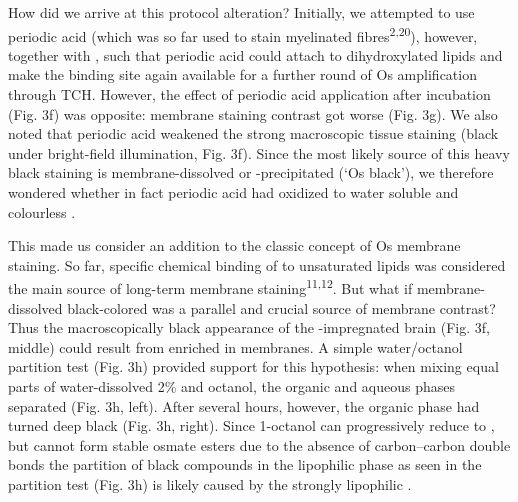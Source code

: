\documentclass{article}
\begin{document}
\noindent How did we arrive at this protocol alteration? Initially, we attempted to use periodic acid (which was so far used to stain myelinated fibres\textsuperscript{2,20}), however, together with , such that periodic acid could attach to dihydroxylated lipids and make the binding site again available for a further round of Os amplification through TCH. However, the effect of periodic acid application after  incubation (Fig. 3f) was opposite: membrane staining contrast got worse (Fig. 3g). We also noted that periodic acid weakened the strong macroscopic tissue staining (black under bright-field illumination, Fig. 3f). Since the most likely source of this heavy black staining is membrane-dissolved or -precipitated  (`Os black'), we therefore wondered whether in fact periodic acid had oxidized  to water soluble and colourless .

This made us consider an addition to the classic concept of Os membrane staining. So far, specific chemical binding of  to unsaturated lipids was considered the main source of long-term membrane staining\textsuperscript{11,12}. But what if membrane-dissolved black-colored  was a parallel and crucial source of membrane contrast? Thus the macroscopically black appearance of the -impregnated brain (Fig. 3f, middle) could result from  enriched in membranes. A simple water/octanol partition test (Fig. 3h) provided support for this hypothesis: when mixing equal parts of water-dissolved 2\%  and octanol, the organic and aqueous phases separated (Fig. 3h, left). After several hours, however, the organic phase had turned deep black (Fig. 3h, right). Since 1-octanol can progressively reduce  to , but cannot form stable osmate esters due to the absence of carbon–carbon double bonds the partition of black compounds in
the lipophilic phase as seen in the partition test (Fig. 3h) is likely caused by the strongly lipophilic .
\end{document}
